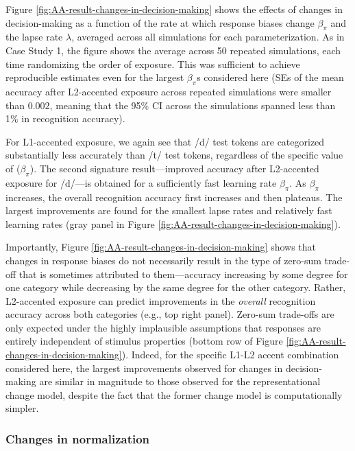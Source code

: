 \documentclass[
  11pt,
  man,floatsintext]{apa6}
\begin{document}
Figure \ref{fig:AA-result-changes-in-decision-making} shows the effects of changes in decision-making as a function of the rate at which response biases change \(\beta_{\pi}\) and the lapse rate \(\lambda\), averaged across all simulations for each parameterization. As in Case Study 1, the figure shows the average across 50 repeated simulations, each time randomizing the order of exposure. This was sufficient to achieve reproducible estimates even for the largest \(\beta_{\pi}\)s considered here (SEs of the mean accuracy after L2-accented exposure across repeated simulations were smaller than \(0.002\), meaning that the 95\% CI across the simulations spanned less than 1\% in recognition accuracy).

For L1-accented exposure, we again see that /d/ test tokens are categorized substantially less accurately than /t/ test tokens, regardless of the specific value of (\(\beta_{\pi}\)). The second signature result---improved accuracy after L2-accented exposure for /d/---is obtained for a sufficiently fast learning rate \(\beta_{\pi}\). As \(\beta_{\pi}\) increases, the overall recognition accuracy first increases and then plateaus. The largest improvements are found for the smallest lapse rates and relatively fast learning rates (gray panel in Figure \ref{fig:AA-result-changes-in-decision-making}).

Importantly, Figure \ref{fig:AA-result-changes-in-decision-making} shows that changes in response biases do not necessarily result in the type of zero-sum trade-off that is sometimes attributed to them---accuracy increasing by some degree for one category while decreasing by the same degree for the other category. Rather, L2-accented exposure can predict improvements in the \emph{overall} recognition accuracy across both categories (e.g., top right panel). Zero-sum trade-offs are only expected under the highly implausible assumptions that responses are entirely independent of stimulus properties (bottom row of Figure \ref{fig:AA-result-changes-in-decision-making}). Indeed, for the specific L1-L2 accent combination considered here, the largest improvements observed for changes in decision-making are similar in magnitude to those observed for the representational change model, despite the fact that the former change model is computationally simpler.

\hypertarget{changes-in-normalization-1}{%
\subsubsection{Changes in normalization}\label{changes-in-normalization-1}}
\end{document}
